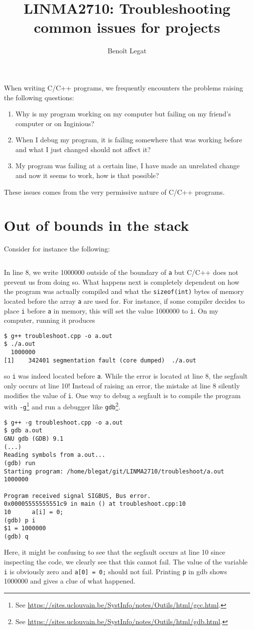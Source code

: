 \documentclass{article}
\title{LINMA2710: Troubleshooting common issues for projects}
\author{Benoît Legat}
\begin{document}
\maketitle

When writing C/C++ programs, we frequently encounters the problems raising the following questions:
\begin{enumerate}
\item Why is my program working on my computer but failing on my friend's computer or on Inginious?
\item When I debug my program, it is failing somewhere that was working before and what I just changed should not affect it?
\item My program was failing at a certain line, I have made an unrelated change and now it seems to work, how is that possible?
\end{enumerate}

These issues comes from the very permissive nature of C/C++ programs.

\section{Out of bounds in the stack}

Consider for instance the following:
\inputminted[linenos]{cpp}{troubleshoot1.cpp}
In line 8, we write 1000000 outside of the boundary of \texttt{a} but C/C++ does not prevent us from doing so.
What happens next is completely dependent on how the program was actually compiled and what the \texttt{sizeof(int)} bytes of memory located before the array \texttt{a} are used for.
For instance, if some compiler decides to place \texttt{i} before \texttt{a} in memory, this will set the value 1000000 to \texttt{i}.
On my computer, running it produces
\begin{verbatim}
$ g++ troubleshoot.cpp -o a.out
$ ./a.out
  1000000
[1]    342401 segmentation fault (core dumped)  ./a.out
\end{verbatim}
so \texttt{i} was indeed located before \texttt{a}.
While the error is located at line 8, the segfault only occurs at line 10!
Instead of raising an error, the mistake at line 8 silently modifies the value of \texttt{i}.
One way to debug a segfault is to compile the program with \texttt{-g}\footnote{See \url{https://sites.uclouvain.be/SystInfo/notes/Outils/html/gcc.html}.} and run a debugger like \texttt{gdb}\footnote{See \url{https://sites.uclouvain.be/SystInfo/notes/Outils/html/gdb.html}.}.
\begin{verbatim}
$ g++ -g troubleshoot.cpp -o a.out
$ gdb a.out
GNU gdb (GDB) 9.1
(...)
Reading symbols from a.out...
(gdb) run
Starting program: /home/blegat/git/LINMA2710/troubleshoot/a.out
1000000

Program received signal SIGBUS, Bus error.
0x00005555555551c9 in main () at troubleshoot.cpp:10
10	    a[i] = 0;
(gdb) p i
$1 = 1000000
(gdb) q
\end{verbatim}
Here, it might be confusing to see that the segfault occurs at line 10 since inspecting the code, we clearly see that this cannot fail.
The value of the variable \texttt{i} is obviously zero and \texttt{a[0] = 0;} should not fail.
Printing \texttt{p} in gdb shows 1000000 and gives a clue of what happened.
\end{document}
